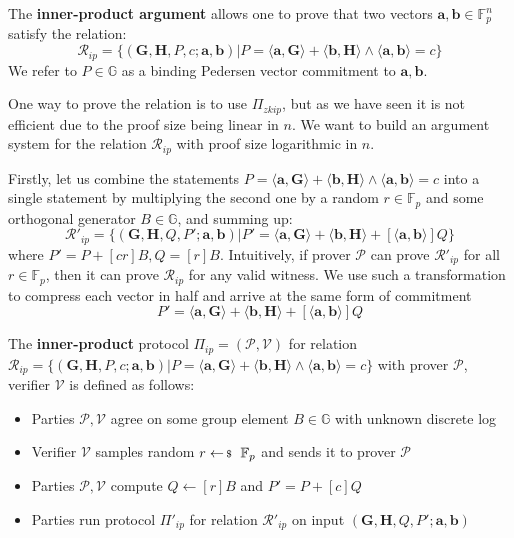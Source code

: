 \documentclass[../../book.tex]{subfiles}
\begin{document}
The \textbf{inner-product argument} allows one to prove that two vectors $\mathbf{a,b} \in \mathbb{F}_p^n$ satisfy the relation:
$$\mathcal{R}_{ip} = \{ (\mathbf{G,H}, P, c; \mathbf{a,b}) \vert P = \langle \mathbf{a,G} \rangle + \langle \mathbf{b,H} \rangle \wedge \langle \mathbf{a,b} \rangle = c \}$$
We refer to $P \in \mathbb{G}$ as a binding Pedersen vector commitment to $\mathbf{a,b}$.

One way to prove the relation is to use $\Pi_{zkip}$, but as we have seen it is not efficient due to the proof size being linear in $n$. We want to build an argument system for the relation $\mathcal{R}_{ip}$ with proof size logarithmic in $n$.

Firstly, let us combine the statements $P = \langle \mathbf{a,G} \rangle + \langle \mathbf{b,H} \rangle \wedge \langle \mathbf{a,b} \rangle = c$ into a single statement by multiplying the second one by a random $r \in \mathbb{F}_p$ and some orthogonal generator $B \in \mathbb{G}$, and summing up:
$$
\mathcal{R}'_{ip} = \{ (\mathbf{G,H}, Q, P'; \mathbf{a,b}) \vert P' = \langle \mathbf{a,G} \rangle + \langle \mathbf{b,H} \rangle + [\langle \mathbf{a,b} \rangle]Q \}
$$
where $P' = P + [cr]B, Q=[r]B$. Intuitively, if prover $\mathcal{P}$ can prove $\mathcal{R}'_{ip}$ for all $r \in \mathbb{F}_p$, then it can prove $\mathcal{R}_{ip}$ for any valid witness. We use such a transformation to compress each vector in half and arrive at the same form of commitment
$$P' = \langle \mathbf{a,G} \rangle + \langle \mathbf{b,H} \rangle + [\langle \mathbf{a,b} \rangle]Q$$

\begin{definition}
    The \textbf{inner-product} protocol $\Pi_{ip} = (\mathcal{P}, \mathcal{V})$ for relation $\mathcal{R}_{ip} = \{ (\mathbf{G,H}, P, c; \mathbf{a,b}) \vert P = \langle \mathbf{a,G} \rangle + \langle \mathbf{b,H} \rangle \wedge \langle \mathbf{a,b} \rangle = c \}$ with prover $\mathcal{P}$, verifier $\mathcal{V}$ is defined as follows:
    \begin{itemize}
        \item Parties $\mathcal{P, V}$ agree on some group element $B \in \mathbb{G}$ with unknown discrete log
        \item Verifier $\mathcal{V}$ samples random $r \leftarrowS \mathbb{F}_p$ and sends it to prover $\mathcal{P}$
        \item Parties $\mathcal{P, V}$ compute $Q \gets [r]B$ and $P' = P + [c]Q$
        \item Parties run protocol $\Pi'_{ip}$ for relation $\mathcal{R}'_{ip}$ on input $(\mathbf{G,H}, Q, P'; \mathbf{a,b})$
    \end{itemize}
\end{definition}
\end{document}
